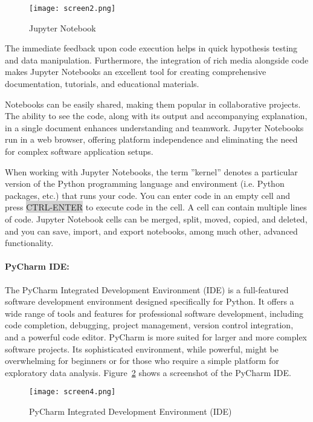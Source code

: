 \begin{figure}
\centering
\texttt{[image: screen2.png]}
\caption{Jupyter Notebook}
\label{fig:jupyter}
\end{figure}

The immediate feedback upon code execution helps in quick hypothesis testing and data manipulation. Furthermore, the integration of rich media alongside code makes Jupyter Notebooks an excellent tool for creating comprehensive documentation, tutorials, and educational materials.

Notebooks can be easily shared, making them popular in collaborative projects. The ability to see the code, along with its output and accompanying explanation, in a single document enhances understanding and teamwork. Jupyter Notebooks run in a web browser, offering platform independence and eliminating the need for complex software application setups.

When working with Jupyter Notebooks, the term ''kernel'' denotes a particular version of the Python programming language and environment (i.e. Python packages, etc.) that runs your code. You can enter code in an empty cell and press \colorbox{lightgray}{CTRL-ENTER} to execute code in the cell. A cell can contain multiple lines of code. Jupyter Notebook cells can be merged, split, moved, copied, and deleted, and you can save, import, and export notebooks, among much other, advanced functionality.

\paragraph{PyCharm IDE:} The PyCharm Integrated Development Environment (IDE) is a full-featured software development environment designed specifically for Python. It offers a wide range of tools and features for professional software development, including code completion, debugging, project management, version control integration, and a powerful code editor. PyCharm is more suited for larger and more complex software projects. Its sophisticated environment, while powerful, might be overwhelming for beginners or for those who require a simple platform for exploratory data analysis. Figure~\ref{fig:pycharm} shows a screenshot of the PyCharm IDE.

\begin{figure}
\centering
\texttt{[image: screen4.png]}
\caption{PyCharm Integrated Development Environment (IDE)}
\label{fig:pycharm}
\end{figure}

